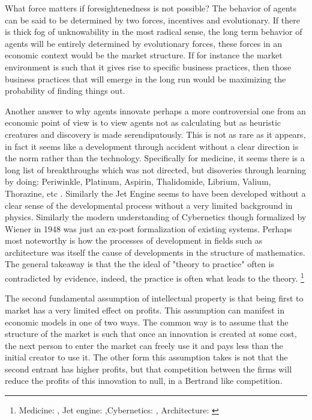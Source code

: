 \documentclass[12pt]{article}
\numberwithin{equation}{section}
\begin{document}
What force matters if foresightenedness is not possible? The behavior of agents can be said to be determined by two forces, incentives and evolutionary. If there is thick fog of unknowability in the most radical sense, the long term behavior of agents will be entirely determined by evolutionary forces, these forces in an economic context would be the market structure. If for instance the market environment is such that it gives rise to specific business practices, then those business practices that will emerge in the long run would be maximizing the probability of finding things out. 

Another answer to why agents innovate perhaps a more controversial one from an economic point of view is to view agents not as calculating but as heuristic creatures and discovery is made serendiputously. This is not as rare as it appears, in fact it seems like a development through accident without a clear direction is the norm rather than the technology. Specifically for medicine, it seems there is a long list of breakthroughs which was not directed, but disoveries through learning by doing: Periwinkle, Platinum, Aspirin, Thalidomide, Librium, Valium, Thorazine, etc . Similarly the Jet Engine seems to have been developed without a clear sense of the developmental process without a very limited background in physics. Similarly the modern understanding of Cybernetics though formalized by Wiener in 1948 was just an ex-post formalization of existing systems. Perhaps most noteworthy is how the processes of development in fields such as architecture was itself the cause of developments in the structure of mathematics. The general takeaway is that the the ideal of "theory to practice" often is contradicted by evidence, indeed, the practice is often what leads to the theory. \footnote{ Medicine: \cite{meyers2007happy}, Jet engine: \cite{scranton2006urgency},Cybernetics: \cite{mindell2002between}, Architecture: \cite{unguru1992guy}}



The second fundamental assumption of intellectual property is that being first to market has a very limited effect on profits. This assumption can manifest in economic models in one of two ways. The common way is to assume that the structure of the market is such that once an innovation is created at some cost, the next person to enter the market can freely use it and pays less than the initial creator to use it. The other form this assumption takes is not that the second entrant has higher profits, but that competition between the firms will reduce the profits of this innovation to null, in a Bertrand like competition. 
\end{document}
